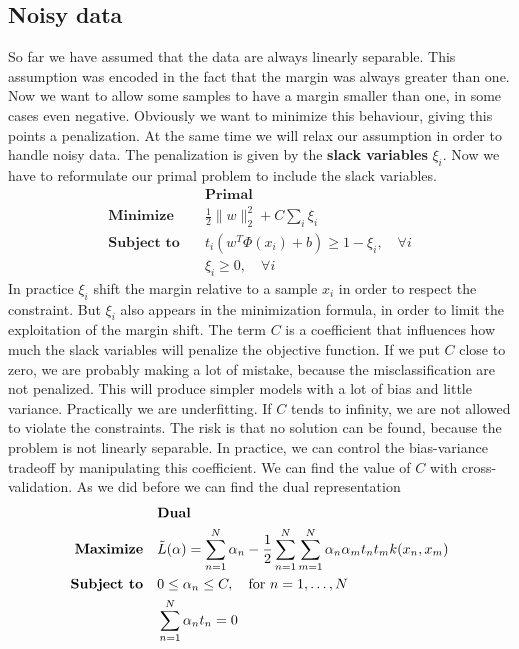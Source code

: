 \documentclass[main.tex]{subfiles}
\begin{document}
\subsection{Noisy data}
So far we have assumed that the data are always linearly separable. This assumption was encoded in the fact that the margin was always greater than one. Now we want to allow some samples to have a margin smaller than one, in some cases even negative. Obviously we want to minimize this behaviour, giving this points a penalization. At the same time we will relax our assumption in order to handle noisy data. The penalization is given by the \textbf{slack variables} $\xi_i$. Now we have to reformulate our primal problem to include the slack variables.
\newpage
\begin{align*}
                              & \textbf{Primal}                                         \\
    \textbf{Minimize} \quad   & \frac{1}{2} \|w\|_2^2 + C\sum_i \xi_i                   \\
    \textbf{Subject to} \quad & t_i (w^T \Phi(x_i) + b) \geq 1 - \xi_i, \quad \forall i \\
                              & \xi_i \geq 0, \quad \forall i
\end{align*}
In practice $\xi_i$ shift the margin relative to a sample $x_i$ in order to respect the constraint. But $\xi_i$ also appears in the minimization formula, in order to limit the exploitation of the margin shift. The term $C$ is a coefficient that influences how much the slack variables will penalize the objective function. If we put $C$ close to zero, we are probably making a lot of mistake, because the misclassification are not penalized. This will produce simpler models with a lot of bias and little variance. Practically we are underfitting. If $C$ tends to infinity, we are not allowed to violate the constraints. The risk is that no solution can be found, because the problem is not linearly separable. In practice, we can control the bias-variance tradeoff by manipulating this coefficient. We can find the value of $C$ with cross-validation.
As we did before we can find the dual representation
\begin{align*}
                              & \textbf{Dual}                                                                                                         \\
    \textbf{Maximize} \quad   & \Tilde{L}(\alpha) = \sum_{n=1}^N \alpha_n - \frac{1}{2}\sum_{n=1}^N \sum_{m=1}^N \alpha_n \alpha_m t_n t_m k(x_n,x_m) \\
    \textbf{Subject to} \quad & 0 \leq \alpha_n \leq C, \quad \text{for } n=1, \dots, N                                                               \\
                              & \sum_{n=1}^N \alpha_n t_n = 0
\end{align*}
\end{document}
